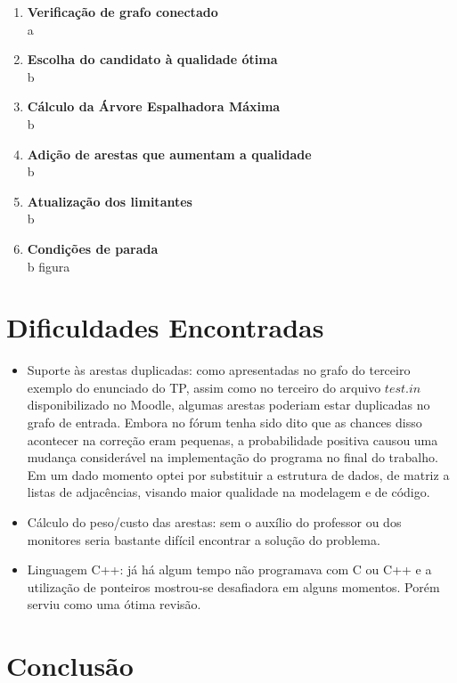 \documentclass[a4paper,12pt,titlepage]{article}
\begin{document}
\begin{enumerate}
\item\textbf{Verificação de grafo conectado} \\
a
\item\textbf{Escolha do candidato à qualidade ótima} \\
b
\item\textbf{Cálculo da Árvore Espalhadora Máxima} \\
b
\item\textbf{Adição de arestas que aumentam a qualidade} \\
b
\item\textbf{Atualização dos limitantes} \\
b
\item\textbf{Condições de parada} \\
b
figura

\end{enumerate}

\section{Dificuldades Encontradas}

\begin{itemize}
\item {Suporte às arestas duplicadas:} como apresentadas no grafo do terceiro exemplo do enunciado do TP, assim como no terceiro do arquivo $test.in$ disponibilizado no Moodle, algumas arestas poderiam estar duplicadas no grafo de entrada. Embora no fórum tenha sido dito que as chances disso acontecer na correção eram pequenas, a probabilidade positiva causou uma mudança considerável na implementação do programa no final do trabalho. Em um dado momento optei por substituir a estrutura de dados, de matriz a listas de adjacências, visando maior qualidade na modelagem e de código.

\item {Cálculo do peso/custo das arestas:} sem o auxílio do professor ou dos monitores seria bastante difícil encontrar a solução do problema.

\item {Linguagem C++:} já há algum tempo não programava com C ou C++ e a utilização de ponteiros mostrou-se desafiadora em alguns momentos. Porém serviu como uma ótima revisão. 

\end{itemize}

\section{Conclusão}
\end{document}
